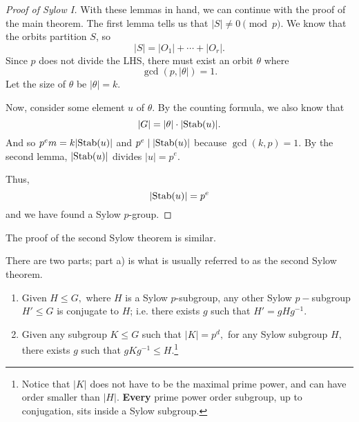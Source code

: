 \begin{proof}[Proof of Sylow I]
    With these lemmas in hand, we can continue with the proof of the main theorem. The first lemma tells us that $|S| \neq 0 \pmod{p}$. We know that the orbits partition $S$, so \[|S| = |O_1| + \cdots + |O_r|.\] Since $p$ does not divide the LHS, there must exist an orbit $\theta$ where \[\gcd(p, |\theta|) = 1.\] Let the size of $\theta$ be $|\theta| = k$. 
    
    Now, consider some element $u$ of $\theta$. By the counting formula, we also know that \[|G| = |\theta| \cdot \lvert\operatorname{Stab}(u) \rvert.\] And so $p^em = k \lvert\operatorname{Stab}(u)\rvert$ and $p^e \mid \lvert\operatorname{Stab}(u)\rvert$ because $\gcd(k, p) = 1$. 
    By the second lemma, $\lvert\operatorname{Stab}(u)\rvert$ divides $|u| = p^e$.

    Thus, \[\lvert\operatorname{Stab}(u)\rvert = p^e\] and we have found a Sylow $p$-group.
\end{proof}

The proof of the second Sylow theorem is similar. 


\begin{theorem}[Sylow II]
There are two parts; part a) is what is usually referred to as the second Sylow theorem.

\begin{enumerate}[label = (\alph*)]
    \item Given $H \leq G,$ where $H$ is a Sylow $p$-subgroup, any other Sylow $p-$subgroup $H' \leq G$ is conjugate to $H$; i.e. there exists $g$ such that $H' = gHg^{-1}$.
    
    \item Given any subgroup $K \leq G$ such that $|K| = p^d,$ for any Sylow subgroup $H,$ there exists $g$ such that $gKg^{-1} \leq H.$\footnote{Notice that $|K|$ does not have to be the maximal prime power, and can have order smaller than $|H|.$ \textbf{Every} prime power order subgroup, up to conjugation, sits inside a Sylow subgroup.}
\end{enumerate}
\end{theorem}

